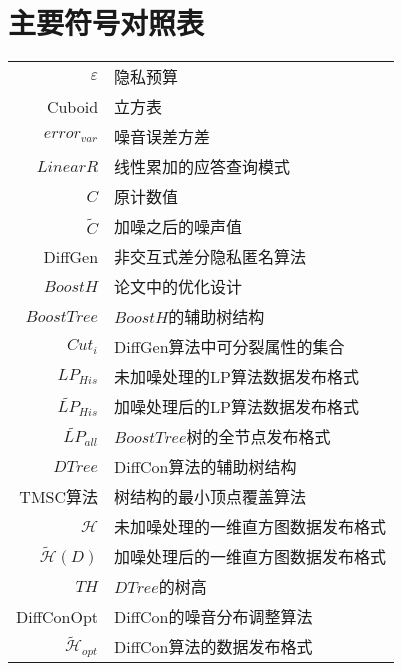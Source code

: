 \chapter{主要符号对照表}
\label{chap:symb}

\begin{longtable}{rl}
 $\varepsilon$     & 隐私预算 \\
 Cuboid         & 立方表 \\
 $error_{var}$  & 噪音误差方差 \\
 $LinearR$ 		& 线性累加的应答查询模式 \\
 $C$            & 原计数值 \\
 $\tilde{C}$            & 加噪之后的噪声值 \\
 DiffGen            & 非交互式差分隐私匿名算法\supercite{DiffGen} \\
 $BoostH$		& 论文\parencite{boosting}中的优化设计\\
 $BoostTree$			& $BoostH$的辅助树结构\\
 $Cut_{i}$		& DiffGen算法中可分裂属性的集合\\
 $LP_{His}$		& 未加噪处理的LP算法数据发布格式\\
 $\widetilde{LP}_{His}$			& 加噪处理后的LP算法数据发布格式\\
 $\widetilde{LP}_{all}$			& $BoostTree$树的全节点发布格式\\
 $DTree$		& DiffCon算法的辅助树结构\\
 TMSC算法		  & 树结构的最小顶点覆盖算法\\
  $\mathcal{H}$		& 未加噪处理的一维直方图数据发布格式\\
 $\tilde{\mathcal{H}}(D)$			& 加噪处理后的一维直方图数据发布格式\\
 $TH$		& $DTree$的树高\\
 DiffConOpt			& DiffCon的噪音分布调整算法\\
 $\tilde{\mathcal{H}}_{opt}$	& DiffCon算法的数据发布格式\\
\end{longtable}

